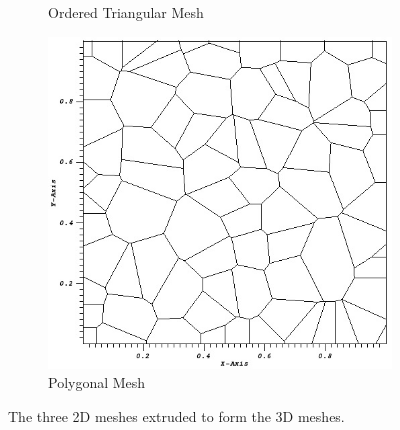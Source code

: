 \documentclass{anstrans}
\begin{document}
\begin{figure}[]
\begin{subfigure}{.5\textwidth}
	\caption{Ordered Triangular Mesh}
	\label{fig::poly_mesh}
\end{subfigure}
\begin{subfigure}{.5\textwidth}
	\centering
	\includegraphics[scale=0.48]{poly_mesh.jpg}
	\caption{Polygonal Mesh}
	\label{fig::shes_mesh}
\end{subfigure}
\caption{The three 2D meshes extruded to form the 3D meshes.}
\label{fig::meshes}
\end{figure}
\end{document}
